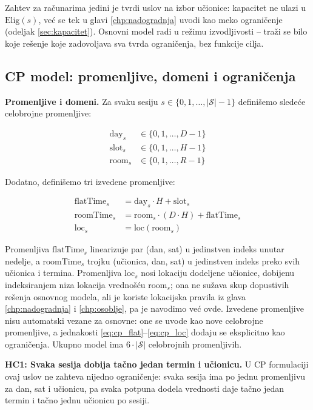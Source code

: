 \documentclass[12pt,oneside]{memoir}
\begin{document}
Zahtev za računarima jedini je tvrdi uslov na izbor
učionice: kapacitet ne ulazi u $\text{Elig}(s)$, već se tek u glavi
\ref{chp:nadogradnja} uvodi kao meko ograničenje (odeljak
\ref{sec:kapacitet}). Osnovni model radi u režimu izvodljivosti --
traži se bilo koje rešenje koje zadovoljava sva tvrda ograničenja, bez
funkcije cilja.

\subsection{CP model: promenljive, domeni i ograničenja}
\label{sec:cp_form}

\textbf{Promenljive i domeni.}
Za svaku sesiju $s \in \{0, 1, \ldots, |\mathcal{S}|-1\}$ definišemo
sledeće celobrojne promenljive:

\begin{align}
\text{day}_s &\in \{0, 1, \ldots, D-1\} \label{eq:cp_day} \\
\text{slot}_s &\in \{0, 1, \ldots, H-1\} \label{eq:cp_slot} \\
\text{room}_s &\in \{0, 1, \ldots, R-1\} \label{eq:cp_room}
\end{align}

Dodatno, definišemo tri izvedene promenljive:

\begin{align}
\text{flatTime}_s &= \text{day}_s \cdot H + \text{slot}_s
  \label{eq:cp_flat} \\
\text{roomTime}_s &= \text{room}_s \cdot (D \cdot H) +
  \text{flatTime}_s \label{eq:cp_roomtime} \\
\text{loc}_s &= \text{loc}(\text{room}_s) \label{eq:cp_loc}
\end{align}

Promenljiva $\text{flatTime}_s$ linearizuje par (dan, sat) u
jedinstven indeks unutar nedelje, a $\text{roomTime}_s$ trojku
(učionica, dan, sat) u jedinstven indeks preko svih učionica i
termina. Promenljiva $\text{loc}_s$ nosi lokaciju dodeljene učionice,
dobijenu indeksiranjem niza lokacija vrednošću $\text{room}_s$; ona ne
sužava skup dopustivih rešenja osnovnog modela, ali je koriste
lokacijska pravila iz glava \ref{chp:nadogradnja} i \ref{chp:osoblje},
pa je navodimo već ovde. Izvedene promenljive nisu automatski vezane
za osnovne: one se uvode kao nove celobrojne promenljive, a jednakosti
\eqref{eq:cp_flat}--\eqref{eq:cp_loc} dodaju se eksplicitno kao
ograničenja. Ukupno model ima $6 \cdot |\mathcal{S}|$ celobrojnih
promenljivih.

\medskip
\textbf{HC1: Svaka sesija dobija tačno jedan termin i učionicu.}
U CP formulaciji ovaj uslov ne zahteva nijedno ograničenje: svaka
sesija ima po jednu promenljivu za dan, sat i učionicu, pa svaka
potpuna dodela vrednosti daje tačno jedan termin i tačno jednu
učionicu po sesiji.
\end{document}
